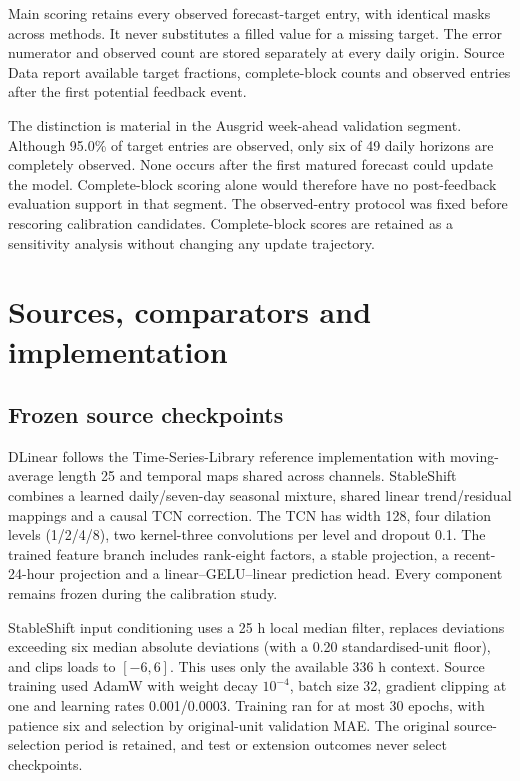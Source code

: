 \documentclass[11pt,a4paper]{article}
\begin{document}
Main scoring retains every observed forecast-target entry, with identical masks across methods. It never substitutes a filled value for a missing target. The error numerator and observed count are stored separately at every daily origin. Source Data report available target fractions, complete-block counts and observed entries after the first potential feedback event.

The distinction is material in the Ausgrid week-ahead validation segment. Although 95.0\% of target entries are observed, only six of 49 daily horizons are completely observed. None occurs after the first matured forecast could update the model. Complete-block scoring alone would therefore have no post-feedback evaluation support in that segment. The observed-entry protocol was fixed before rescoring calibration candidates. Complete-block scores are retained as a sensitivity analysis without changing any update trajectory.

\section{Sources, comparators and implementation}
\subsection{Frozen source checkpoints}
DLinear follows the Time-Series-Library reference implementation with moving-average length 25 and temporal maps shared across channels. StableShift combines a learned daily/seven-day seasonal mixture, shared linear trend/residual mappings and a causal TCN correction. The TCN has width 128, four dilation levels (1/2/4/8), two kernel-three convolutions per level and dropout 0.1. The trained feature branch includes rank-eight factors, a stable projection, a recent-24-hour projection and a linear--GELU--linear prediction head. Every component remains frozen during the calibration study.

StableShift input conditioning uses a 25 h local median filter, replaces deviations exceeding six median absolute deviations (with a 0.20 standardised-unit floor), and clips loads to $[-6,6]$. This uses only the available 336 h context. Source training used AdamW with weight decay $10^{-4}$, batch size 32, gradient clipping at one and learning rates 0.001/0.0003. Training ran for at most 30 epochs, with patience six and selection by original-unit validation MAE. The original source-selection period is retained, and test or extension outcomes never select checkpoints.
\end{document}
